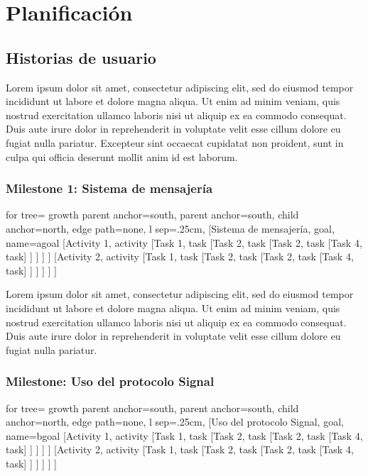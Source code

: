 \chapter{Planificación}

\section{Historias de usuario}

Lorem ipsum dolor sit amet, consectetur adipiscing elit, sed do eiusmod tempor incididunt ut labore et dolore magna aliqua. Ut enim ad minim veniam, quis nostrud exercitation ullamco laboris nisi ut aliquip ex ea commodo consequat. Duis aute irure dolor in reprehenderit in voluptate velit esse cillum dolore eu fugiat nulla pariatur. Excepteur sint occaecat cupidatat non proident, sunt in culpa qui officia deserunt mollit anim id est laborum.

\subsection{Milestone 1: Sistema de mensajería}
\begin{adjustbox}{margin=2.5ex 5ex 2.5ex 2.5ex,center}
	\begin{forest} for tree={
	    growth parent anchor=south,
	    parent anchor=south,
	    child anchor=north,
	    edge path={none}, 
	    l sep=.25cm,
	}   
	[Sistema de mensajería, goal, name=agoal
	    [Activity 1, activity
	        [Task 1, task
	        [Task 2, task
	        [Task 2, task
	        [Task 4, task] ] ] ] ]
	    [Activity 2, activity
	        [Task 1, task
	        [Task 2, task
	        [Task 2, task
	        [Task 4, task] ] ] ] ] ]
	\end{forest}
\end{adjustbox}

Lorem ipsum dolor sit amet, consectetur adipiscing elit, sed do eiusmod tempor incididunt ut labore et dolore magna aliqua. Ut enim ad minim veniam, quis nostrud exercitation ullamco laboris nisi ut aliquip ex ea commodo consequat. Duis aute irure dolor in reprehenderit in voluptate velit esse cillum dolore eu fugiat nulla pariatur.
	
\subsection{Milestone: Uso del protocolo Signal}

\begin{adjustbox}{margin=2.5ex 5ex 2.5ex 2.5ex,center}
	\begin{forest} for tree={
			growth parent anchor=south,
			parent anchor=south,
			child anchor=north,
			edge path={none}, 
			l sep=.25cm,
	}   
	[Uso del protocolo Signal, goal, name=bgoal
		[Activity 1, activity
		[Task 1, task
		[Task 2, task
		[Task 2, task
		[Task 4, task] ] ] ] ]
		[Activity 2, activity
		[Task 1, task
		[Task 2, task
		[Task 2, task
		[Task 4, task] ] ] ] ] ]
	\end{forest}
\end{adjustbox}

